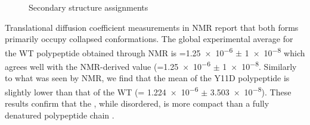 \begin{figure}
	\centering     %
	\caption{Secondary structure assignments}
	\label{fig:fm}
\end{figure}


Translational diffusion coefficient measurements in NMR report that both \gct{} forms primarily occupy collapsed conformations. The global experimental average for the WT polypeptide obtained through NMR is \diffusion{}=\num{1.25e-6} $\pm$  \SI{1e-8}{\dcunits} which agrees well with the NMR-derived value (\diffusion=\num{1.25e-6} $\pm$  \SI{1e-8}{\dcunits}. Similarly to what was seen by NMR, we find that the mean \diffusion of the Y11D \gct{} polypeptide is slightly lower than that of the WT \gct{} (\diffusion= \num{1.224e-6} $\pm$ \SI{3.503e-8}{\dcunits}). These results confirm that the \gct{}, while disordered, is more compact than a fully denatured polypeptide chain . 

